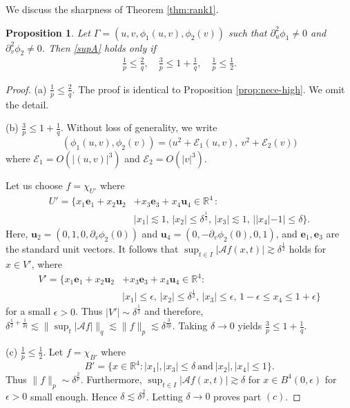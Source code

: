 \documentclass[10pt] %
{amsart}
\theoremstyle{plain}
\newtheorem{prop}[thm]{Proposition}
\numberwithin{equation}{section}
\newcommand{\R}{\mathbb R}
\begin{document}
 

We discuss the sharpness of Theorem \ref{thm:rank1}.

\begin{prop}\label{nece:rank1}
Let $\Gamma=(u,v,\phi_1(u,v),\phi_2(v))$ such that $\partial_u^2\phi_1 \neq0$ and $\partial_v^2\phi_2\neq0$. Then \eqref{supA} holds only if
\begin{align}\label{pqrange1}
\tfrac 1p \le \tfrac 2q, \quad \tfrac 3p \le 1+\tfrac 1q, \quad \tfrac 1p \le \tfrac12.
\end{align}
\end{prop}

\begin{proof}
(a) $\frac 1p\le \frac 2q$. The proof is identical to Proposition \ref{prop:nece-high}. We omit the detail.

\smallskip

\noindent (b) $\frac3p\le 1+\frac1q$. 
Without loss of generality, we write 
\[
(\phi_1(u,v),\phi_2(v))=\big(u^2+\mathcal E_1(u,v),~v^2+\mathcal E_2(v)\big)
\]
where $\mathcal E_1 = O(|(u,v)|^3)$ and $\mathcal E_2  = O(|v|^3)$.  

Let us choose $f=\chi_{U'}$ where 
\begin{align*}
U'=\{x_1\mathbf e_1+ x_2\mathbf u_2&+x_3\mathbf e_3+x_4\mathbf u_4 \in \R^4 \,:\,  \\
 &|x_1|\lesssim 1,\,|x_2|\le \delta^{\frac12},\,|x_3| \lesssim 1,\,||x_4|-1|\le \delta\}.
\end{align*}
Here, $\mathbf u_2=(0,1,0,\partial_v\phi_2(0))$ and $\mathbf u_4=(0,-\partial_v\phi_2(0),0,1)$, and $\mathbf e_1, \mathbf e_3$ are the standard unit vectors. 
It follows that $\sup_{t\in I}|\mathcal Af(x,t)|\gtrsim \delta^{\frac 12}$ holds for $x\in V'$, where 
\begin{align*}
V'=\{x_1\mathbf e_1+x_2\mathbf u_2&+x_3\mathbf e_3+x_4\mathbf u_4\in \R^4: \\
&|x_1|\le \epsilon,\,|x_2|\le \delta^{\frac12},\, |x_3|\le \epsilon,\,1-\epsilon \le x_4 \le 1+\epsilon\}
\end{align*}
for a small $\epsilon>0$. Thus $|V'|\sim \delta^{\frac12}$ and therefore, $\delta^{\frac 12+\frac 1{2q}} \lesssim \| \sup_t|\mathcal Af|\|_q \lesssim \|f\|_p \lesssim \delta^{\frac 3{2p}}$.
Taking $\delta \rightarrow 0$ yields $\frac 3p\le1+\frac1q$.

\smallskip

\noindent(c) $\frac1p\le\frac12$. Let $f=\chi_{B'}$ where 
\[
B'=\{x\in \R^4:|x_1|,|x_3|\le \delta ~\text{and}~ |x_2|,|x_4|\le1\}.
\]
Thus $\|f\|_p\sim \delta^{\frac 2p}$. Furthermore, $\sup_{t\in I}|\mathcal Af(x,t)|\gtrsim \delta$ for $x\in B^4(0,\epsilon)$ for $\epsilon>0$ small enough. Hence $\delta\lesssim \delta^{\frac 2p}$. Letting $\delta \rightarrow0$ proves part $(c)$.
\end{proof}
\end{document}
